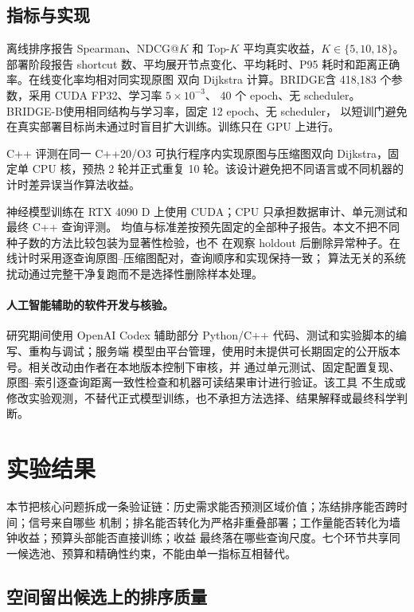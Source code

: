 \documentclass[UTF8,a4paper,10pt,twocolumn]{ctexart}
\newcommand{\gmethod}{BRIDGE}
\newcommand{\bmethod}{BRIDGE-B}
\begin{document}
\subsection{指标与实现}

离线排序报告 Spearman、NDCG@$K$ 和 Top-$K$ 平均真实收益，$K\in\{5,10,18\}$。部署阶段报告
shortcut 数、平均展开节点变化、平均耗时、P95 耗时和距离正确率。在线变化率均相对同实现原图
双向 Dijkstra 计算。\gmethod 含 418,183 个参数，采用 CUDA FP32、学习率 $5\times10^{-3}$、
40 个 epoch、无 scheduler。\bmethod 使用相同结构与学习率，固定 12 epoch、无 scheduler，
以短训门避免在真实部署目标尚未通过时盲目扩大训练。训练只在 GPU 上进行。

C++ 评测在同一 C++20/O3 可执行程序内实现原图与压缩图双向 Dijkstra，固定单 CPU 核，预热
2 轮并正式重复 10 轮。该设计避免把不同语言或不同机器的计时差异误当作算法收益。

神经模型训练在 RTX 4090 D 上使用 CUDA；CPU 只承担数据审计、单元测试和最终 C++ 查询评测。
均值与标准差按预先固定的全部种子报告。本文不把不同种子数的方法比较包装为显著性检验，也不
在观察 holdout 后删除异常种子。在线计时采用逐查询原图--压缩图配对，查询顺序和实现保持一致；
算法无关的系统扰动通过完整干净复跑而不是选择性删除样本处理。

\paragraph{人工智能辅助的软件开发与核验。}
研究期间使用 OpenAI Codex 辅助部分 Python/C++ 代码、测试和实验脚本的编写、重构与调试；服务端
模型由平台管理，使用时未提供可长期固定的公开版本号。相关改动由作者在本地版本控制下审核，并
通过单元测试、固定配置复现、原图--索引逐查询距离一致性检查和机器可读结果审计进行验证。该工具
不生成或修改实验观测，不替代正式模型训练，也不承担方法选择、结果解释或最终科学判断。

\section{实验结果}

本节把核心问题拆成一条验证链：历史需求能否预测区域价值；冻结排序能否跨时间；信号来自哪些
机制；排名能否转化为严格非重叠部署；工作量能否转化为墙钟收益；预算头部能否直接训练；收益
最终落在哪些查询尺度。七个环节共享同一候选池、预算和精确性约束，不能由单一指标互相替代。

\subsection{空间留出候选上的排序质量}
\end{document}
